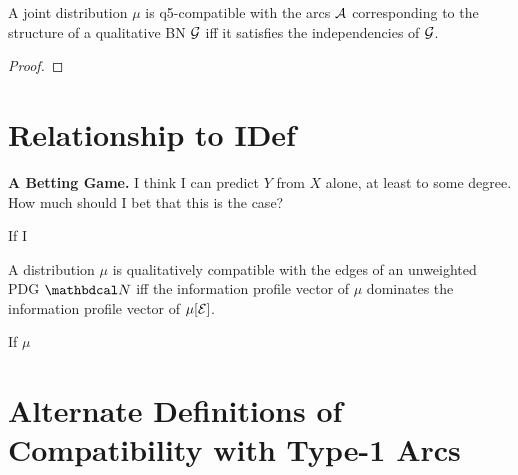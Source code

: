 \documentclass{article}
\begin{document}
\begin{prop}
    A joint distribution $\mu$ is q5-compatible with the arcs $\mathcal A$ corresponding to the structure of a qualitative BN $\cal G$ iff it satisfies the independencies of $\cal G$. 
\end{prop}
\begin{proof}
\end{proof}

\clearpage
\section{Relationship to IDef}

\textbf{A Betting Game.} 
I think I can predict $Y$ from $X$ alone, at least to some degree.
How much should I bet that this is the case?

If I 


\begin{conj}
    A distribution $\mu$ is qualitatively compatible with the edges of an unweighted PDG $\dg N$ iff 
    the information profile vector of $\mu$ dominates the information profile vector of $\mu[\mathcal E]$. 
\end{conj}
\begin{conj}
    If $\mu$ 
\end{conj}


\appendix
\clearpage
\section{Alternate Definitions of Compatibility with Type-1 Arcs}
\end{document}
